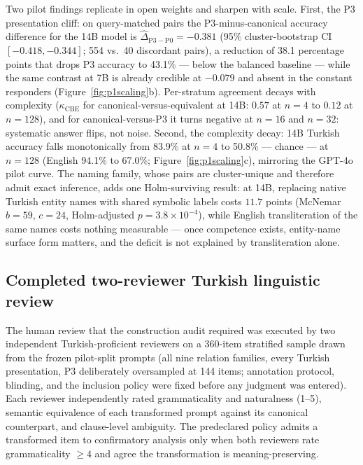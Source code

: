 Two pilot findings replicate in open weights and sharpen with scale. First, the P3 presentation cliff:
on query-matched pairs the P3-minus-canonical accuracy difference for the 14B model is
$\widehat{\Delta}_{\mathrm{P3-P0}} = -0.381$ (95\% cluster-bootstrap CI $[-0.418, -0.344]$; 554 vs.\ 40
discordant pairs), a reduction of 38.1 percentage points that drops P3 accuracy to 43.1\% --- below the
balanced baseline --- while the same contrast at 7B is already credible at $-0.079$ and absent in the
constant responders (Figure~\ref{fig:p1scaling}b). Per-stratum agreement decays with complexity
($\kappa_{\mathrm{CBE}}$ for canonical-versus-equivalent at 14B: $0.57$ at $n{=}4$ to $0.12$ at
$n{=}128$), and for canonical-versus-P3 it turns negative at $n{=}16$ and $n{=}32$: systematic answer
flips, not noise. Second, the complexity decay: 14B Turkish accuracy falls monotonically from 83.9\% at
$n{=}4$ to 50.8\% --- chance --- at $n{=}128$ (English 94.1\% to 67.0\%; Figure~\ref{fig:p1scaling}c),
mirroring the GPT-4o pilot curve. The naming family, whose pairs are cluster-unique and therefore admit
exact inference, adds one Holm-surviving result: at 14B, replacing native Turkish entity names with shared
symbolic labels costs $11.7$ points (McNemar $b{=}59$, $c{=}24$, Holm-adjusted $p = 3.8\times10^{-4}$),
while English transliteration of the same names costs nothing measurable --- once competence exists,
entity-name surface form matters, and the deficit is not explained by transliteration alone.

\subsection{Completed two-reviewer Turkish linguistic review}
\label{sec:review}

The human review that the construction audit required was executed by two independent Turkish-proficient
reviewers on a 360-item stratified sample drawn from the frozen pilot-split prompts (all nine relation
families, every Turkish presentation, P3 deliberately oversampled at 144 items; annotation protocol,
blinding, and the inclusion policy were fixed before any judgment was entered). Each reviewer
independently rated grammaticality and naturalness (1--5), semantic equivalence of each transformed
prompt against its canonical counterpart, and clause-level ambiguity. The predeclared policy admits a
transformed item to confirmatory analysis only when both reviewers rate grammaticality $\ge 4$ and agree
the transformation is meaning-preserving.

